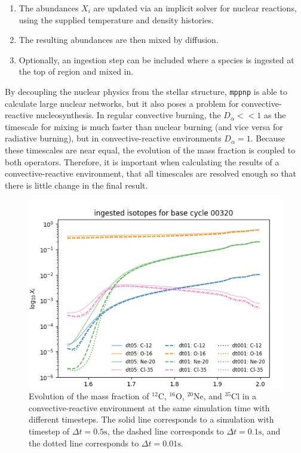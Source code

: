 \begin{enumerate}
\item The abundances $X_i$ are updated via an implicit solver for nuclear reactions, using the supplied temperature and density histories.
\item The resulting abundances are then mixed by diffusion.
\item Optionally, an ingestion step can be included where a species is ingested at the top of region and mixed in.
\end{enumerate}

By decoupling the nuclear physics from the stellar structure, \texttt{mppnp} is able to calculate large nuclear networks, but it also poses a problem for convective-reactive nucleosynthesis.
In regular convective burning, the $D_\alpha << 1$ as the timescale for mixing is much faster than nuclear burning (and vice versa for radiative burning), but in convective-reactive environments $D_\alpha = 1$.
Because these timescales are near equal, the evolution of the mass fraction is coupled to both operators. 
Therefore, it is important when calculating the results of a convective-reactive environment, that all timescales are resolved enough so that there is little change in the final result.

\begin{figure}[!htbp]
\includegraphics[width=\textwidth]{chapters/1/figures/time_resolution [temp].png}
\caption{Evolution of the mass fraction of $^{12}\mathrm{C}$, $^{16}\mathrm{O}$, $^{20}\mathrm{Ne}$, and $^{35}\mathrm{Cl}$ in a convective-reactive environment at the same simulation time with different timesteps. The solid line corresponds to a simulation with timestep of $\Delta t = 0.5 \mathrm{s}$, the dashed line corresponds to $\Delta t = 0.1 \mathrm{s}$, and the dotted line corresponds to $\Delta t = 0.01 \mathrm{s}$. 
\label{fig:time_resolution}}
\end{figure}

